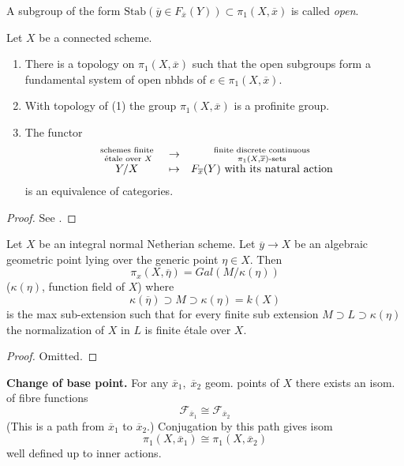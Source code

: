 \begin{definition}
\label{definition-open}
A subgroup of the form
$\text{Stab}(\overline y\in F_{\overline x}(Y))\subset \pi_1(X, \overline x)$
is called {\it open}.
\end{definition}

\begin{theorem}[Grothendieck]
\label{theorem-fundamental-group}
Let $X$ be a connected scheme.
\begin{enumerate}
\item There is a topology on $\pi_1(X, \overline x)$ such that the open
subgroups form a fundamental system of open nbhds of $e\in \pi_1(X, \overline
x)$.
\item With topology of (1) the group
$\pi_1(X, \overline x)$ is a profinite group.
\item The functor
$$
\begin{matrix}
\text{ schemes finite }\atop \text{ \'etale over }X & \to &
\text{ finite discrete continuous }\atop \pi_1(X, \overline x)\text{-sets}\\
Y / X& \mapsto & F_{\overline x}(Y) \text{ with its natural action}
\end{matrix}
$$
is an equivalence of categories.
\end{enumerate}
\end{theorem}

\begin{proof}
See \cite{SGA1}.
\end{proof}

\begin{proposition}
\label{proposition-integral-normal-fundamental-group}
Let $X$ be an integral normal Netherian scheme. Let
$\overline y\to X$ be an algebraic geometric point lying
over the generic point $\eta\in X$. Then
$$
\pi_x(X, \overline \eta) = Gal(M/\kappa(\eta))
$$
($\kappa(\eta)$, function field of $X$) where
$$
\kappa(\overline \eta)\supset M\supset \kappa(\eta) = k(X)
$$
is the max sub-extension such that for every finite sub extension
$M\supset L\supset \kappa(\eta)$ the normalization of $X$ in $L$ is finite
\'etale over $X$.
\end{proposition}

\begin{proof}
Omitted.
\end{proof}

\noindent
{\bf Change of base point.} For any $\overline x_1, \; \overline x_2$
geom. points of $X$ there exists an isom. of fibre functions
$$
\mathcal{F}_{\overline x_1} \cong \mathcal{F}_{\overline x_2}
$$
(This is a path from $\overline x_1$ to $\overline x_2$.) Conjugation
by this path gives isom
$$
\pi_1(X, \overline x_1) \cong \pi_1(X, \overline x_2)
$$
well defined up to inner actions.

